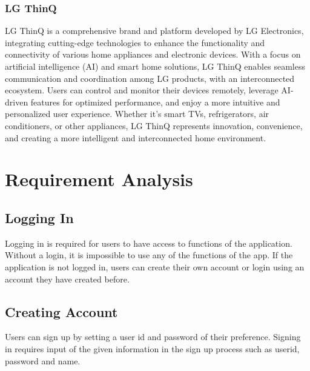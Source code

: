 \documentclass[conference]{IEEEtran}
\begin{document}
        \subsubsection{LG ThinQ}
            LG ThinQ is a comprehensive brand and platform developed by LG Electronics, integrating cutting-edge technologies to enhance the functionality and connectivity of various home appliances and electronic devices. With a focus on artificial intelligence (AI) and smart home solutions, LG ThinQ enables seamless communication and coordination among LG products, with an interconnected ecosystem. Users can control and monitor their devices remotely, leverage AI-driven features for optimized performance, and enjoy a more intuitive and personalized user experience. Whether it's smart TVs, refrigerators, air conditioners, or other appliances, LG ThinQ represents innovation, convenience, and creating a more intelligent and interconnected home environment.
    \section{Requirement Analysis}
    
    \subsection{Logging In}
    Logging in is required for users to have access to functions of the application. Without a login, it is impossible to use any of the functions of the app. If the application is not logged in, users can create their own account or login using an account they have created before. 
    
    \subsection{Creating Account}
    Users can sign up by setting a user id and password of their preference. Signing in requires input  of the given information in the sign up process such as userid, password and name.
    
\end{document}
